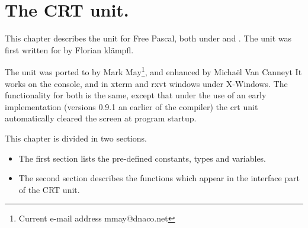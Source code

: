 %
%
%
%
%
\chapter{The CRT unit.}
This chapter describes the  unit for Free Pascal, both under \dos
and \linux. The unit was first written for \dos by Florian kl\"ampfl. 

The unit was ported to \linux by Mark May\footnote{Current
e-mail address \textsf{mmay@dnaco.net}}, and enhanced by Micha\"el Van Canneyt
It works on the \linux console, and in xterm and rxvt windows under
X-Windows. The functionality for both is the same, except that under \linux
the use of an early implementation (versions 0.9.1 an earlier of the
compiler) the crt unit automatically cleared the screen at program startup.

This chapter is divided in two sections. 
\begin{itemize}
\item The first section lists the pre-defined constants, types and variables. 
\item The second section describes the functions which appear in the
interface part of the CRT unit.
\end{itemize}

